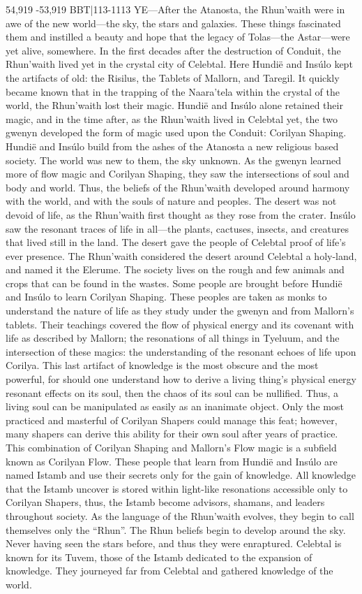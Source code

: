 \documentclass[smalldemyvopaper,11pt,twoside,onecolumn,openright,extrafontsizes]{memoir}
\begin{document}
{{54,919 -53,919 BBT|113-1113 YE—After the Atanosta, the Rhun’waith were in awe of the new world—the sky, the stars and galaxies. These things fascinated them and instilled a beauty and hope that the legacy of Tolas—the Astar—were yet alive, somewhere. In the first decades after the destruction of Conduit, the Rhun’waith lived yet in the crystal city of Celebtal. Here Hundië and Insúlo kept the artifacts of old: the Risilus, the Tablets of Mallorn, and Taregil. It quickly became known that in the trapping of the Naara’tela within the crystal of the world, the Rhun’waith lost their magic. Hundië and Insúlo alone retained their magic, and in the time after, as the Rhun’waith lived in Celebtal yet, the two gwenyn developed the form of magic used upon the Conduit: Corilyan Shaping.
	Hundië and Insúlo build from the ashes of the Atanosta a new religious based society. The world was new to them, the sky unknown. As the gwenyn learned more of flow magic and Corilyan Shaping, they saw the intersections of soul and body and world. Thus, the beliefs of the Rhun’waith developed around harmony with the world, and with the souls of nature and peoples. The desert was not devoid of life, as the Rhun’waith first thought as they rose from the crater. Insúlo saw the resonant traces of life in all—the plants, cactuses, insects, and creatures that lived still in the land. The desert gave the people of Celebtal proof of life’s ever presence. The Rhun’waith considered the desert around Celebtal a holy-land, and named it the Elerume. The society lives on the rough and few animals and crops that can be found in the wastes.
Some people are brought before Hundië and Insúlo to learn Corilyan Shaping. These peoples are taken as monks to understand the nature of life as they study under the gwenyn and from Mallorn’s tablets. Their teachings covered the flow of physical energy and its covenant with life as described by Mallorn; the resonations of all things in Tyeluum, and the intersection of these magics: the understanding of the resonant echoes of life upon Corilya. This last artifact of knowledge is the most obscure and the most powerful, for should one understand how to derive a living thing’s physical energy resonant effects on its soul, then the chaos of its soul can be nullified. Thus, a living soul can be manipulated as easily as an inanimate object. Only the most practiced and masterful of Corilyan Shapers could manage this feat; however, many shapers can derive this ability for their own soul after years of practice. This combination of Corilyan Shaping and Mallorn’s Flow magic is a subfield known as Corilyan Flow. These people that learn from Hundië and Insúlo are named Istamb and use their secrets only for the gain of knowledge. All knowledge that the Istamb uncover is stored within light-like resonations accessible only to Corilyan Shapers, thus, the Istamb become advisors, shamans, and leaders throughout society.
As the language of the Rhun’waith evolves, they begin to call themselves only the “Rhun”. The Rhun beliefs begin to develop around the sky. Never having seen the stars before, and thus they were enraptured.
Celebtal is known for its Tuvem, those of the Istamb dedicated to the expansion of knowledge. They journeyed far from Celebtal and gathered knowledge of the world.

}}
\end{document}
